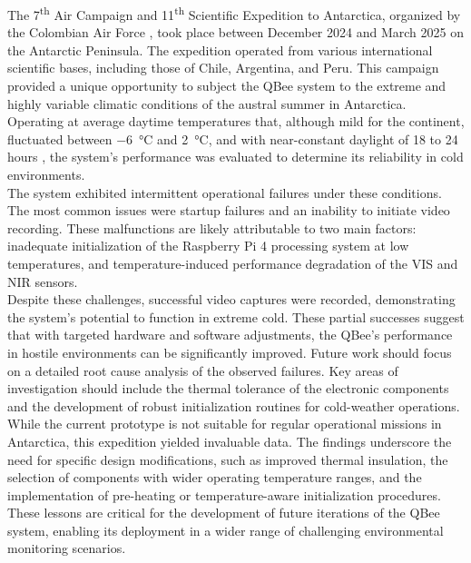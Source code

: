 The 7\textsuperscript{th} Air Campaign and 11\textsuperscript{th} Scientific Expedition to Antarctica, organized by the Colombian Air Force \cite{FAC_Antartida_2025}, took place between December 2024 and March 2025 on the Antarctic Peninsula. The expedition operated from various international scientific bases, including those of Chile, Argentina, and Peru. This campaign provided a unique opportunity to subject the QBee system to the extreme and highly variable climatic conditions of the austral summer in Antarctica. Operating at average daytime temperatures that, although mild for the continent, fluctuated between \SI{-6}{\celsius} and \SI{2}{\celsius}, and with near-constant daylight of 18 to 24 hours \cite{SeasonsYear_Antarctica}, the system's performance was evaluated to determine its reliability in cold environments.\\

\noindent The system exhibited intermittent operational failures under these conditions. The most common issues were startup failures and an inability to initiate video recording. These malfunctions are likely attributable to two main factors: inadequate initialization of the Raspberry Pi 4 processing system at low temperatures, and temperature-induced performance degradation of the VIS and NIR sensors.\\

\noindent Despite these challenges, successful video captures were recorded, demonstrating the system's potential to function in extreme cold. These partial successes suggest that with targeted hardware and software adjustments, the QBee's performance in hostile environments can be significantly improved. Future work should focus on a detailed root cause analysis of the observed failures. Key areas of investigation should include the thermal tolerance of the electronic components and the development of robust initialization routines for cold-weather operations.\\

\noindent While the current prototype is not suitable for regular operational missions in Antarctica, this expedition yielded invaluable data. The findings underscore the need for specific design modifications, such as improved thermal insulation, the selection of components with wider operating temperature ranges, and the implementation of pre-heating or temperature-aware initialization procedures. These lessons are critical for the development of future iterations of the QBee system, enabling its deployment in a wider range of challenging environmental monitoring scenarios.\\
    
